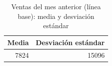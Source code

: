 
\begin{longtable}[t]{rr}
\caption{Ventas del mes anterior (línea base): media y desviación estándar}\\
\toprule
Media & Desviación estándar\\
\midrule
7824 & 15096\\
\bottomrule
\end{longtable}
